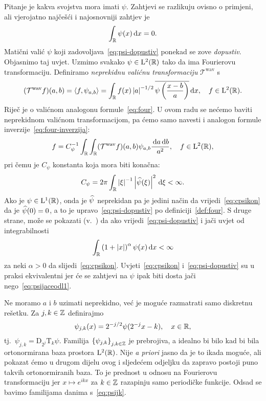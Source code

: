 \documentclass[main.tex]{subfiles}
\newcommand{\mr}[1]{\mathrm{#1}}
\newcommand{\mc}[1]{\mathcal{#1}}
\begin{document}
Pitanje je kakva svojstva mora imati \( \psi \). Zahtjevi se razlikuju ovisno o primjeni,
ali vjerojatno najčešći i najosnovniji zahtjev je
\begin{equation}\label{eq:psi-dopustiv}
	\int_{\mathbb{R}} \psi(x) \,\mathrm d x = 0.
\end{equation}
Matični valić \( \psi \) koji zadovoljava~\eqref{eq:psi-dopustiv} ponekad se zove \emph{dopustiv}.
Objasnimo taj uvjet. Uzmimo svakako \( \psi \in \mathrm{L}^2(\mathbb{R}) \) tako da ima
Fourierovu transformaciju. Definiramo \emph{neprekidnu valićnu transformaciju} \( {\mc T^{\mr{wav}}} \) s
\begin{equation}\label{eq:cwt}
	(\mc T^{\mr{wav}} f)(a,b) = \skp f{\psi_{a,b}} =
	\int_\R f(x) \abs a^{-1/2} \ol{\psi\left( \frac{x-b}a \right)} \D x, \quad f \in \L^2(\R).
\end{equation}
Riječ je o valićnom analogonu formule~\eqref{eq:four}.
U ovom radu se nećemo baviti neprekidnom valićnom transformacijom, pa ćemo
samo navesti i analogon formule inverzije~\eqref{eq:four-inverzija}:
\begin{equation}\label{eq:wav-inverzija}
	f = C_\psi^{-1} \int_\R \int_\R
	(\mc T^{\mr{wav}} f)(a,b) \psi_{a,b} \frac{\D a \D b}{a^2}, \quad f \in \L^2(\R),
\end{equation}
pri čemu je \( C_\psi \) konstanta koja mora biti konačna:
\begin{equation}\label{eq:cpsikon}
	C_\psi = 2\pi \int_{\mathbb{R}} \left| {\xi} \right| ^{-1} \left| {\widehat{\psi}(\xi)} \right|^2 \,\mathrm d \xi < \infty.
\end{equation}
Ako je \( \psi \in \mathrm{L}^1(\mathbb{R}) \), onda je \( \widehat{\psi} \)
neprekidan pa je jedini način da vrijedi~\eqref{eq:cpsikon}
da je \( \widehat{\psi} (0)=0 \), a to je
upravo~\eqref{eq:psi-dopustiv} po definiciji~\ref{def:four}.
S druge strane, može se pokazati (v.~\cite[]{daub}) da ako vrijedi~\eqref{eq:psi-dopustiv}
i jači uvjet od integrabilnosti
\begin{equation}\label{eq:psijaceodl1}
	\int_{\mathbb{R}} \left( 1 + \left| {x} \right| \right)^\alpha \psi(x) \,\mathrm d x < \infty
\end{equation}
za neki \( \alpha > 0 \) da slijedi~\eqref{eq:cpsikon}.
Uvjeti~\eqref{eq:cpsikon} i~\eqref{eq:psi-dopustiv} su u
praksi ekvivalentni jer će se zahtjevi na \( \psi \)
ipak biti dosta jači nego~\eqref{eq:psijaceodl1}.

Ne moramo \( a \) i \( b \) uzimati neprekidno, već je moguće
razmatrati samo diskretnu rešetku. Za \( j, k \in \mathbb{Z} \) definirajmo
\begin{equation}\label{eq:psijk}
	\psi_{j, k}(x) = 2^{-j/2} \psi(2^{-j}x-k), \quad x \in \mathbb{R},
\end{equation}
tj.\ \( \psi_{j,k} = \mr D_{2^j}\mr T_k \psi \). Familija
\( \left\{ \psi_{j,k} \right\}_{j,k\in\mathbb{Z}} \) je prebrojiva, a
idealno bi bilo kad bi bila ortonormirana baza prostora \( \mathrm{L}^2(\mathbb{R}) \).
Nije \emph{a priori} jasno da je to ikada moguće, ali
pokazat ćemo u drugom dijelu ovog i sljedećem odjeljku da
zapravo postoji puno takvih ortonormiranih baza.
To je prednost u odnosu na Fourierovu transformaciju jer
\( x \mapsto e^{ikx} \) za \( k \in \mathbb{Z} \) razapinju
samo periodičke funkcije. Odsad se bavimo familijama danima s~\eqref{eq:psijk}.
\end{document}
